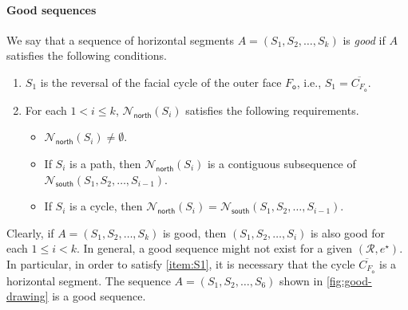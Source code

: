 \documentclass{theoretics}
\newcommand{\RR}{\mathcal{R}}
\newcommand{\FO}{F_\mathsf{o}}
\newcommand{\Nnorth}{\mathcal{N}_\mathsf{north}}
\newcommand{\Nsouth}{\mathcal{N}_\mathsf{south}}
\newcommand{\eref}{e^\star}
\begin{document}
\paragraph{Good sequences} 
We say that a sequence of horizontal segments $A = (S_1, S_2, \ldots, S_{k})$ is \emph{good} if $A$ satisfies the following conditions.
\begin{enumerate}[(S1)]
    \item \label{item:S1} $S_1$ is the reversal of the facial cycle of the outer face $\FO$, i.e., $S_1 = \overline{C_{\FO}}$.
    \item \label{item:S2} For each $1 < i \leq k$, $\Nnorth(S_i)$ satisfies the following requirements.
\begin{itemize}
    \item $\Nnorth(S_i) \neq \emptyset$.
    \item If $S_i$ is a path, then $\Nnorth(S_i)$ is a contiguous subsequence of $\Nsouth(S_1, S_2, \ldots, S_{i-1})$.
    \item If $S_i$ is a cycle, then $\Nnorth(S_i) = \Nsouth(S_1, S_2, \ldots, S_{i-1})$. 
\end{itemize}    
\end{enumerate}

Clearly, if $A=(S_1, S_2, \ldots, S_{k})$ is good, then $(S_1, S_2, \ldots, S_{i})$ is also good for each $1 \leq i < k$. In general, a good sequence might not exist for a given $(\RR,\eref)$. In particular, in order to satisfy \ref{item:S1}, it is necessary that the cycle $\overline{C_{\FO}}$ is a horizontal segment. The sequence $A=(S_1, S_2, \ldots, S_6)$ shown in \cref{fig:good-drawing} is a good sequence.
\end{document}
